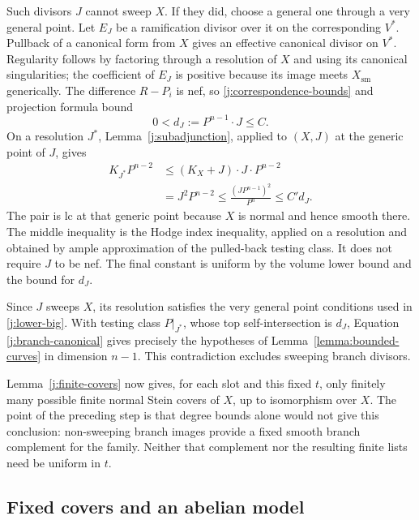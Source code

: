 Such divisors $J$ cannot sweep $X$. If they did, choose a general
one through a very general point. Let $E_J$ be a ramification
divisor over it on the corresponding $V^*$. Pullback of a
canonical form from $X$ gives an effective canonical divisor on
$V^*$. Regularity follows by factoring through a resolution of
$X$ and using its canonical singularities; the coefficient of
$E_J$ is positive because its image meets $X_{\mathrm{sm}}$
generically. The difference $R-P_i$ is nef, so
\eqref{j:correspondence-bounds} and projection formula bound
\[
                    0<d_J:=P^{n-1}\cdot J\le C.
\]
On a resolution $J^*$, Lemma~\ref{j:subadjunction}, applied to
$(X,J)$ at the generic point of $J$, gives
\begin{equation}\label{j:branch-canonical}
 \begin{split}
 K_{J^*}P^{n-2}
 &\le(K_X+J)\cdot J\cdot P^{n-2}\\
 &=J^2P^{n-2}
 \le\frac{(JP^{n-1})^2}{P^n}
 \le C' d_J.
 \end{split}
\end{equation}
The pair is lc at that generic point because $X$ is normal and
hence smooth there. The middle inequality is the Hodge index
inequality, applied on a resolution and obtained by ample
approximation of the pulled-back testing class. It does not require
$J$ to be nef. The final constant is uniform by the volume lower
bound and the bound for $d_J$.

Since $J$ sweeps $X$, its resolution satisfies the very general
point conditions used in \eqref{j:lower-big}. With testing class
$P|_{J^*}$, whose top self-intersection is $d_J$, Equation
\eqref{j:branch-canonical} gives precisely the hypotheses of
Lemma~\ref{lemma:bounded-curves} in dimension $n-1$. This
contradiction excludes sweeping branch divisors.

Lemma~\ref{j:finite-covers} now gives, for each slot and this fixed
$t$, only finitely many possible finite normal Stein covers of
$X$, up to isomorphism over $X$. The point of the preceding step
is that degree bounds alone would not give this conclusion:
non-sweeping branch images provide a fixed smooth branch complement
for the family. Neither that complement nor the resulting finite
lists need be uniform in $t$.

\subsection{Fixed covers and an abelian model}

